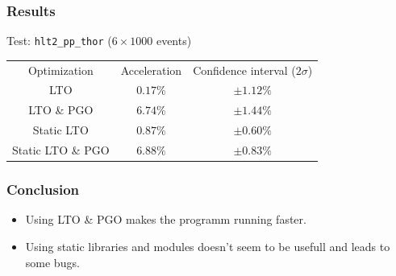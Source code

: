 \documentclass{beamer}
\begin{document}
    \begin{frame}[fragile]
        \frametitle{Results}

        Test: \verb'hlt2_pp_thor' ($6 \times 1000$ events)
        \begin{center}
            \begin{tabular}{ c c c }
                Optimization & Acceleration & Confidence interval ($2\sigma$) \\
                LTO & $0.17\%$ & $\pm 1.12\%$ \\
                LTO \& PGO & $6.74\%$ & $\pm 1.44\%$ \\
                Static LTO & $0.87\%$ & $\pm 0.60\%$ \\
                Static LTO \& PGO & $6.88\%$ & $\pm 0.83\%$
            \end{tabular}
        \end{center}
    \end{frame}

    \begin{frame}
        \frametitle{Conclusion}

        \begin{itemize}
            \item Using LTO \& PGO makes the programm running faster.
            \item Using static libraries and modules doesn't seem to be usefull and leads to some bugs.
        \end{itemize}
    \end{frame}
\end{document}
